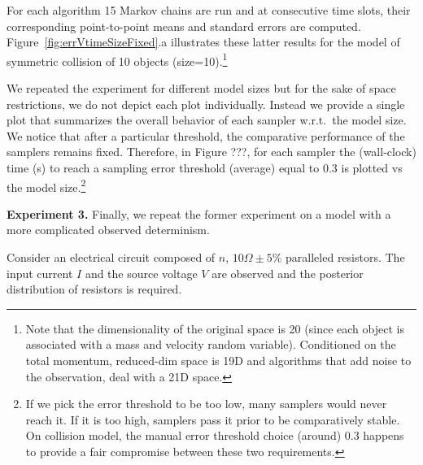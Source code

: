 \documentclass{article}
\begin{document}
For each algorithm 15 Markov chains are run and 
at consecutive time slots, their corresponding point-to-point means and standard errors are computed. 
Figure~\ref{fig:errVtimeSizeFixed}.a 
illustrates these latter results for the model of symmetric collision of 10 objects (size=10).\footnote{
Note that the dimensionality of the original space is 20 (since each object is associated with a mass and velocity random variable). Conditioned on the total momentum, reduced-dim space is 19D and algorithms that add noise to the observation, deal with  a 21D space.
} 

We repeated the experiment for different model sizes but for the sake of space restrictions, we do not depict each plot individually.
Instead we provide a single plot that summarizes the overall behavior of each sampler w.r.t.\ the model size.
We notice that after a particular threshold, the comparative performance of the samplers remains fixed.
Therefore, in Figure ???, for each sampler the (wall-clock) time (s) to reach a sampling error threshold (average) equal to 0.3 is plotted vs the model size.\footnote{
If we pick the error threshold to be too low, many samplers would never reach it. If it is too high, samplers pass it prior to be comparatively stable. On collision model, the manual error threshold choice (around) 0.3 happens to provide a fair compromise between these two requirements.  
}%

  
%


\textbf{Experiment 3.} Finally, we repeat the former experiment on a model with a more complicated observed determinism. 


Consider an electrical circuit composed of $n$, $10\Omega\pm5\%$ paralleled resistors.
The input current $I$ and the source voltage $V$ are observed
and the posterior distribution of resistors is required.
\end{document}
